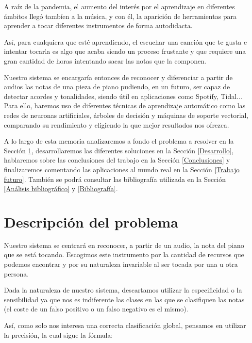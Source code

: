 \documentclass[12pt]{article}
\begin{document}
A raíz de la pandemia, el aumento del interés por el aprendizaje en diferentes ámbitos llegó tambíen a la música, y con él, la aparición
de herramientas para aprender a tocar diferentes instrumentos de forma autodidacta.

\bigskip
Así, para cualquiera que esté aprendiendo, el escuchar una canción que te gusta e intentar tocarla es algo que acaba siendo un proceso
frustante y que requiere una gran cantidad de horas intentando sacar las notas que la componen.

\bigskip
Nuestro sistema se encargaría entonces de reconocer y diferenciar a partir de audios las notas de una pieza de piano
pudiendo, en un futuro, ser capaz de detectar acordes y tonalidades, siendo útil en aplicaciones como Spotify, Tidal... Para ello, haremos uso
de diferentes técnicas de aprendizaje automático como las redes de neuronas artificiales, árboles de decisión y máquinas de soporte vectorial,
comparando su rendimiento y eligiendo la que mejor resultados nos ofrezca.

\bigskip
A lo largo de esta memoria analizaremos a fondo el problema a resolver en la Sección \ref{Descripción del problema}, desarrollaremos las diferentes soluciones en la
Sección \ref{Desarrollo}, hablaremos sobre las conclusiones del trabajo en la Sección \ref{Conclusiones} y finalizaremos comentando las aplicaciones al mundo
real en la Sección \ref{Trabajo futuro}. También se podrá consultar las bibliografía utilizada en la Sección \ref{Análisis bibliográfico} y \ref{Bibliografía}.

\newpage

\section{Descripción del problema}
\label{Descripción del problema}

Nuestro sistema se centrará en reconocer, a partir de un audio, la nota del piano que se está tocando. Escogimos este instrumento por la cantidad de recursos
que podemos encontrar y por su naturaleza invariable al ser tocada por una u otra persona.

\bigskip
Dada la naturaleza de nuestro sistema, descartamos utilizar la especificidad o la sensibilidad ya que nos es indiferente las clases en las que se clasifiquen
las notas (el coste de un falso positivo o un falso negativo es el mismo).

\bigskip
Así, como solo nos interesa una correcta clasificación global, pensamos en utilizar la precisión, la cual sigue la fórmula:
\end{document}
